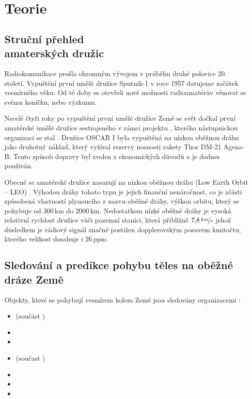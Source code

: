 \chapter{Teorie}
\section[Struční přehled amaterských družic]{Struční přehled\\ amaterských družic}

Radiokomunikace prošla ohromným vývojem v průběhu druhé polovice 20. století. Vypuštění první umělé družice Sputnik-1 v roce 1957 datujeme začátek vesmírného věku. Od té doby se otevřeli nové možnosti radioamatérův věnovat se svému koníčku, nebo výzkumu.

    Necelé čtyři roky po vypuštění první umělé družice Země se svět dočkal první amatérské umělé družice sestrojeného v rámci projektu  \cite{wiki:amateur_sat}, kterého nástupnickou organizaci se stal  \cite{wiki:AMSAT}. Družice OSCAR I byla vypuštěná na nízkou oběžnou dráhu jako druhotný náklad, který vyžíval rezervy nosnosti rakety  Thor DM-21 Agena-B. Tento způsob dopravy byl zvolen z ekonomických důvodů a je dodnes používán.

    Obecně se amatérské družice nasazují na nízkou oběžnou dráhu (Low Earth Orbit -- LEO) \cite{book:ARRL_handbook}. Výhodou dráhy tohoto typu je jejich finanční nenáročnost, co je zčásti způsobená vlastností plynoucího z nazvu oběžné dráhy, výškou orbitu, který se pohybuje od $300\,\mathrm{km}$ do $2000\,\mathrm{km}$. Nedostatkem nízké oběžné dráhy je vysoká relativní rychlost družice vůči pozemní stanici, která přibližně $7{,}8\,\mathrm{\nicefrac{km}{s}}$ \cite{wiki:LEO} jehož důsledkem je rádiový signál značně postižen dopplerovským posuvem kmitočtu, kterého velikost dosahuje i $26\,\mathrm{ppm}$.



\section{Sledování a predikce pohybu těles na oběžné dráze Země}
\label{sec:position}

Objekty, které se pohybují vesmírem kolem Země jsou sledovány organizacemi \cite{wiki:derbis}:
\begin{itemize}
    \item {}(součást )
    \item {}
    \item {}
    \item {}(součast )
    \item {}
    \item {}
    \item {}
\end{itemize}

